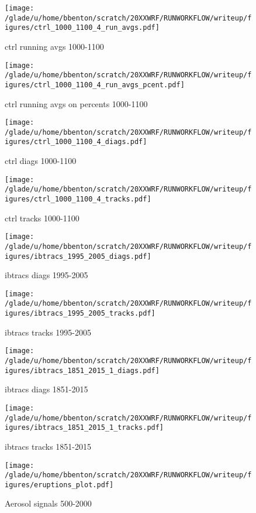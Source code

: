 \begin{figure}[!tbp]
\centering
\begin{minipage}[b]{0.45\textwidth}
\texttt{[image: /glade/u/home/bbenton/scratch/20XXWRF/RUNWORKFLOW/writeup/figures/ctrl\_1000\_1100\_4\_run\_avgs.pdf]}
\caption{ctrl running avgs 1000-1100}
\end{minipage}
\hfill
\begin{minipage}[b]{0.45\textwidth}
\texttt{[image: /glade/u/home/bbenton/scratch/20XXWRF/RUNWORKFLOW/writeup/figures/ctrl\_1000\_1100\_4\_run\_avgs\_pcent.pdf]}
\caption{ctrl running avgs on percents 1000-1100}
\end{minipage}
\end{figure}


\begin{figure}[!tbp]
\centering
\begin{minipage}[b]{0.45\textwidth}
\texttt{[image: /glade/u/home/bbenton/scratch/20XXWRF/RUNWORKFLOW/writeup/figures/ctrl\_1000\_1100\_4\_diags.pdf]}
\caption{ctrl diags 1000-1100}
\end{minipage}
\hfill
\begin{minipage}[b]{0.45\textwidth}
\texttt{[image: /glade/u/home/bbenton/scratch/20XXWRF/RUNWORKFLOW/writeup/figures/ctrl\_1000\_1100\_4\_tracks.pdf]}
\caption{ctrl tracks 1000-1100}
\end{minipage}
\end{figure}

\begin{figure}[!tbp]
\centering
\begin{minipage}[b]{0.45\textwidth}
\texttt{[image: /glade/u/home/bbenton/scratch/20XXWRF/RUNWORKFLOW/writeup/figures/ibtracs\_1995\_2005\_diags.pdf]}
\caption{ibtracs diags 1995-2005}
\end{minipage}
\hfill
\begin{minipage}[b]{0.45\textwidth}
\texttt{[image: /glade/u/home/bbenton/scratch/20XXWRF/RUNWORKFLOW/writeup/figures/ibtracs\_1995\_2005\_tracks.pdf]}
\caption{ibtracs tracks 1995-2005}
\end{minipage}
\end{figure}

\begin{figure}[!tbp]
\centering
\begin{minipage}[b]{0.45\textwidth}
\texttt{[image: /glade/u/home/bbenton/scratch/20XXWRF/RUNWORKFLOW/writeup/figures/ibtracs\_1851\_2015\_1\_diags.pdf]}
\caption{ibtracs diags 1851-2015}
\end{minipage}
\hfill
\begin{minipage}[b]{0.45\textwidth}
\texttt{[image: /glade/u/home/bbenton/scratch/20XXWRF/RUNWORKFLOW/writeup/figures/ibtracs\_1851\_2015\_1\_tracks.pdf]}
\caption{ibtracs tracks 1851-2015}
\end{minipage}
\end{figure}

\begin{figure}[!tbp]
\centering
\texttt{[image: /glade/u/home/bbenton/scratch/20XXWRF/RUNWORKFLOW/writeup/figures/eruptions\_plot.pdf]}
\caption{Aerosol signals 500-2000}
\end{figure}





